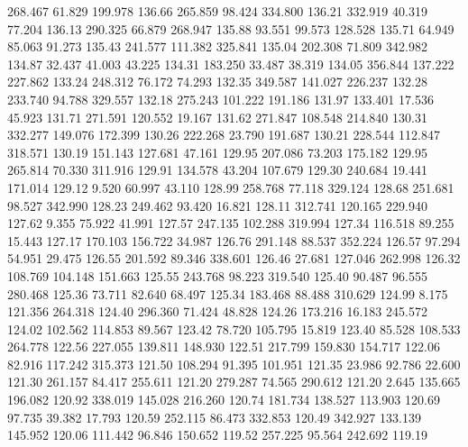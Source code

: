  268.467   61.829  199.978       136.66
 265.859   98.424  334.800       136.21
 332.919   40.319   77.204       136.13
 290.325   66.879  268.947       135.88
  93.551   99.573  128.528       135.71
  64.949   85.063   91.273       135.43
 241.577  111.382  325.841       135.04
 202.308   71.809  342.982       134.87
  32.437   41.003   43.225       134.31
 183.250   33.487   38.319       134.05
 356.844  137.222  227.862       133.24
 248.312   76.172   74.293       132.35
 349.587  141.027  226.237       132.28
 233.740   94.788  329.557       132.18
 275.243  101.222  191.186       131.97
 133.401   17.536   45.923       131.71
 271.591  120.552   19.167       131.62
 271.847  108.548  214.840       130.31
 332.277  149.076  172.399       130.26
 222.268   23.790  191.687       130.21
 228.544  112.847  318.571       130.19
 151.143  127.681   47.161       129.95
 207.086   73.203  175.182       129.95
 265.814   70.330  311.916       129.91
 134.578   43.204  107.679       129.30
 240.684   19.441  171.014       129.12
   9.520   60.997   43.110       128.99
 258.768   77.118  329.124       128.68
 251.681   98.527  342.990       128.23
 249.462   93.420   16.821       128.11
 312.741  120.165  229.940       127.62
   9.355   75.922   41.991       127.57
 247.135  102.288  319.994       127.34
 116.518   89.255   15.443       127.17
 170.103  156.722   34.987       126.76
 291.148   88.537  352.224       126.57
  97.294   54.951   29.475       126.55
 201.592   89.346  338.601       126.46
  27.681  127.046  262.998       126.32
 108.769  104.148  151.663       125.55
 243.768   98.223  319.540       125.40
  90.487   96.555  280.468       125.36
  73.711   82.640   68.497       125.34
 183.468   88.488  310.629       124.99
   8.175  121.356  264.318       124.40
 296.360   71.424   48.828       124.26
 173.216   16.183  245.572       124.02
 102.562  114.853   89.567       123.42
  78.720  105.795   15.819       123.40
  85.528  108.533  264.778       122.56
 227.055  139.811  148.930       122.51
 217.799  159.830  154.717       122.06
  82.916  117.242  315.373       121.50
 108.294   91.395  101.951       121.35
  23.986   92.786   22.600       121.30
 261.157   84.417  255.611       121.20
 279.287   74.565  290.612       121.20
   2.645  135.665  196.082       120.92
 338.019  145.028  216.260       120.74
 181.734  138.527  113.903       120.69
  97.735   39.382   17.793       120.59
 252.115   86.473  332.853       120.49
 342.927  133.139  145.952       120.06
 111.442   96.846  150.652       119.52
 257.225   95.564  242.692       119.19

